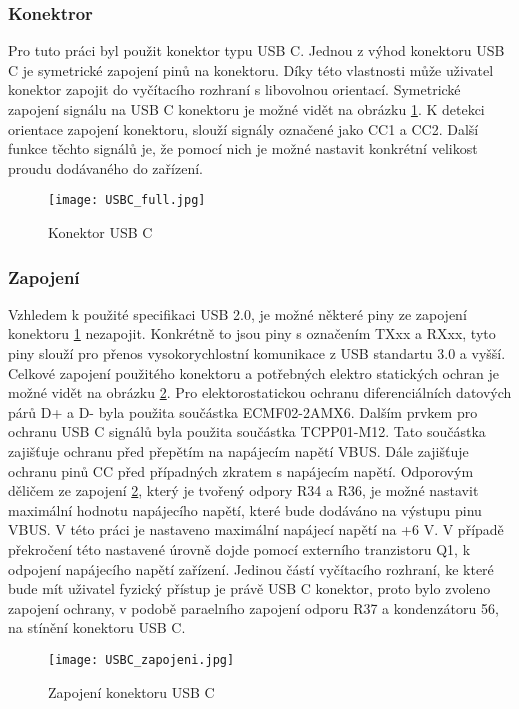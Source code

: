 	\subsubsection{Konektror}
	Pro tuto práci byl použit konektor typu USB C. Jednou z výhod konektoru USB C je symetrické zapojení pinů na konektoru. Díky této vlastnosti může uživatel konektor zapojit do vyčítacího rozhraní s libovolnou orientací. Symetrické zapojení signálu na USB C konektoru je možné vidět na obrázku \ref{fig:USBC_full}. K detekci orientace zapojení konektoru, slouží signály označené jako CC1 a CC2. Další funkce těchto signálů je, že pomocí nich je možné nastavit konkrétní velikost proudu dodávaného do zařízení. 
	\begin{figure}[h!]
		\centering
		\captionsetup{justification=centering}
		\texttt{[image: USBC\_full.jpg]}
		\caption{Konektor USB C} 
		\label{fig:USBC_full}
	\end{figure} 

	\subsubsection{Zapojení}
	Vzhledem k použité specifikaci USB 2.0, je možné některé piny ze zapojení konektoru \ref{fig:USBC_full} nezapojit. Konkrétně to jsou piny s označením TXxx a RXxx, tyto piny slouží pro přenos vysokorychlostní komunikace z USB standartu 3.0 a vyšší. Celkové zapojení použitého konektoru a potřebných elektro statických ochran je možné vidět na obrázku \ref{fig:USBC_zapojeni}. Pro elektorostatickou ochranu diferenciálních datových párů D+ a D- byla použita součástka ECMF02-2AMX6. Dalším prvkem pro ochranu USB C signálů byla použita součástka TCPP01-M12. Tato součástka zajišťuje ochranu před přepětím na napájecím napětí VBUS. Dále zajišťuje ochranu pinů CC před případných zkratem s napájecím napětí. Odporovým děličem ze zapojení \ref{fig:USBC_zapojeni}, který je tvořený odpory R34 a R36, je možné nastavit maximální hodnotu napájecího napětí, které bude dodáváno na výstupu pinu VBUS. V této práci je nastaveno maximální napájecí napětí na +6 V. V případě překročení této nastavené úrovně dojde pomocí externího tranzistoru Q1, k odpojení napájecího napětí zařízení. Jedinou částí vyčítacího rozhraní, ke které bude mít uživatel fyzický přístup je právě USB C konektor, proto bylo zvoleno zapojení ochrany, v podobě paraelního zapojení odporu R37 a kondenzátoru 56, na stínění konektoru USB C. 
	\begin{figure}[h!]
		\centering
		\captionsetup{justification=centering}
		\texttt{[image: USBC\_zapojeni.jpg]}
		\caption{Zapojení konektoru USB C} 
		\label{fig:USBC_zapojeni}
	\end{figure} 
	

